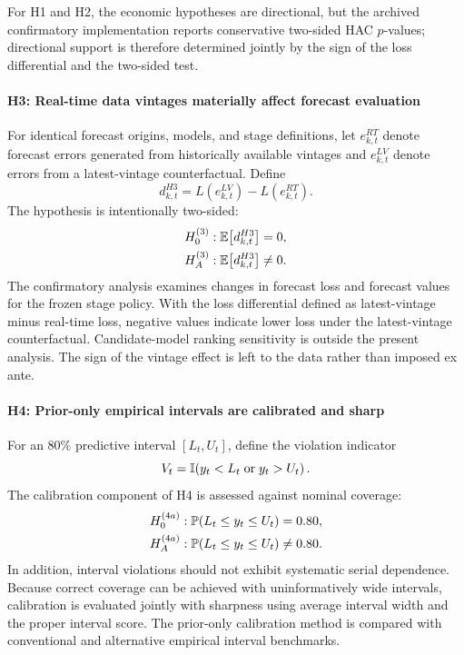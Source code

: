 For H1 and H2, the economic hypotheses are directional, but the archived
confirmatory implementation reports conservative two-sided HAC \(p\)-values;
directional support is therefore determined jointly by the sign of the loss
differential and the two-sided test.

\paragraph{H3: Real-time data vintages materially affect forecast evaluation}
For identical forecast origins, models, and stage definitions, let $e_{k,t}^{RT}$ denote forecast errors generated from historically available vintages and $e_{k,t}^{LV}$ denote errors from a latest-vintage counterfactual. Define
\begin{equation}
    d_{k,t}^{H3}
    =
    L\!\left(e_{k,t}^{LV}\right)
    -
    L\!\left(e_{k,t}^{RT}\right).
    \label{eq:h3_loss_diff}
\end{equation}
The hypothesis is intentionally two-sided:
\begin{align}
    H_{0}^{(3)} &: \mathbb{E}\!\left[d_{k,t}^{H3}\right] = 0,
    \label{eq:h3_null}\\
    H_{A}^{(3)} &: \mathbb{E}\!\left[d_{k,t}^{H3}\right] \neq 0.
    \label{eq:h3_alt}
\end{align}
The confirmatory analysis examines changes in forecast loss and forecast values for the frozen stage policy. With the loss differential defined as latest-vintage minus real-time loss, negative values indicate lower loss under the latest-vintage counterfactual. Candidate-model ranking sensitivity is outside the present analysis. The sign of the vintage effect is left to the data rather than imposed ex ante.

\paragraph{H4: Prior-only empirical intervals are calibrated and sharp}
For an 80\% predictive interval $[L_t,U_t]$, define the violation indicator
\begin{equation}
    V_t = \mathbb{I}\!\left(y_t<L_t \;\text{or}\; y_t>U_t\right).
    \label{eq:h4_violation}
\end{equation}
The calibration component of H4 is assessed against nominal coverage:
\begin{align}
    H_{0}^{(4a)} &: \mathbb{P}(L_t\leq y_t\leq U_t)=0.80,
    \label{eq:h4_coverage_null}\\
    H_{A}^{(4a)} &: \mathbb{P}(L_t\leq y_t\leq U_t)\neq0.80.
    \label{eq:h4_coverage_alt}
\end{align}
In addition, interval violations should not exhibit systematic serial dependence. Because correct coverage can be achieved with uninformatively wide intervals, calibration is evaluated jointly with sharpness using average interval width and the proper interval score. The prior-only calibration method is compared with conventional and alternative empirical interval benchmarks.


